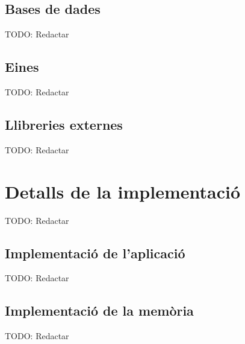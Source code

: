 \subsection{Bases de dades}

TODO: Redactar

\subsection{Eines}

TODO: Redactar

\subsection{Llibreries externes}

TODO: Redactar


\section{Detalls de la implementació}

TODO: Redactar

\subsection{Implementació de l'aplicació}

TODO: Redactar

\subsection{Implementació de la memòria}

TODO: Redactar
